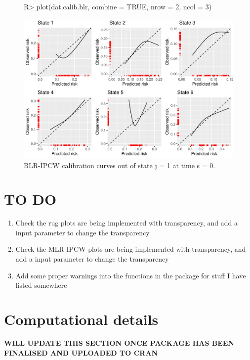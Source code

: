 \documentclass[nojss]{jss}
\begin{document}
\begin{figure}[t!]
\centering
\begin{Schunk}
\begin{Sinput}
R> plot(dat.calib.blr, combine = TRUE, nrow = 2, ncol = 3)
\end{Sinput}
\end{Schunk}
\includegraphics{overview-006}
\caption{\label{fig:blrj1s0} BLR-IPCW calibration curves out of state j =  1 at time s = 0.}
\end{figure}

\section*{TO DO}

\begin{enumerate}
  \item Check the rug plots are being implemented with transparency, and add a input parameter to change the transparency
  \item Check the MLR-IPCW plots are being implemented with transparency, and add a input parameter to change the transparency
  \item Add some proper warnings into the functions in the package for stuff I have listed somewhere
\end{enumerate}

\section*{Computational details}

\textbf{WILL UPDATE THIS SECTION ONCE PACKAGE HAS BEEN FINALISED AND UPLOADED TO CRAN}
\end{document}
